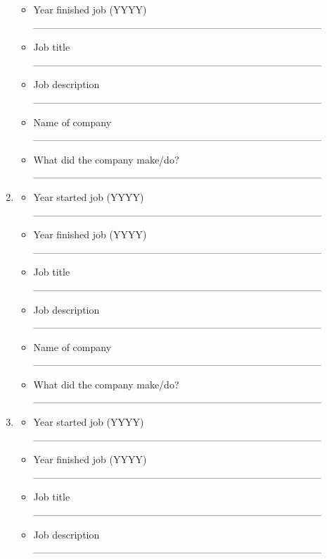 \documentclass[a4paper,10pt]{article}
\begin{document}
\begin{enumerate}
\begin{itemize}
         \item Year finished job (YYYY) \_\_\_\_\_\_\_\_\_\_\_\_\_\_\_\_\_\_\_\_\_\_\_\_\_\_\_\_\_\_\_\_\_\_\_\_\_\_\_
         \item Job title \_\_\_\_\_\_\_\_\_\_\_\_\_\_\_\_\_\_\_\_\_\_\_\_\_\_\_\_\_\_\_\_\_\_\_\_\_\_\_
         \item Job description \_\_\_\_\_\_\_\_\_\_\_\_\_\_\_\_\_\_\_\_\_\_\_\_\_\_\_\_\_\_\_\_\_\_\_\_\_\_\_
         \item Name of company \_\_\_\_\_\_\_\_\_\_\_\_\_\_\_\_\_\_\_\_\_\_\_\_\_\_\_\_\_\_\_\_\_\_\_\_\_\_\_
         \item What did the company make/do? \_\_\_\_\_\_\_\_\_\_\_\_\_\_\_\_\_\_\_\_\_\_\_\_\_\_\_\_\_\_\_\_\_\_\_\_\_\_\_
      \end{itemize}
 \item
     \begin{itemize}
         \item Year started job (YYYY) \_\_\_\_\_\_\_\_\_\_\_\_\_\_\_\_\_\_\_\_\_\_\_\_\_\_\_\_\_\_\_\_\_\_\_\_\_\_\_ 
         \item Year finished job (YYYY) \_\_\_\_\_\_\_\_\_\_\_\_\_\_\_\_\_\_\_\_\_\_\_\_\_\_\_\_\_\_\_\_\_\_\_\_\_\_\_
         \item Job title \_\_\_\_\_\_\_\_\_\_\_\_\_\_\_\_\_\_\_\_\_\_\_\_\_\_\_\_\_\_\_\_\_\_\_\_\_\_\_
         \item Job description \_\_\_\_\_\_\_\_\_\_\_\_\_\_\_\_\_\_\_\_\_\_\_\_\_\_\_\_\_\_\_\_\_\_\_\_\_\_\_
         \item Name of company \_\_\_\_\_\_\_\_\_\_\_\_\_\_\_\_\_\_\_\_\_\_\_\_\_\_\_\_\_\_\_\_\_\_\_\_\_\_\_
         \item What did the company make/do? \_\_\_\_\_\_\_\_\_\_\_\_\_\_\_\_\_\_\_\_\_\_\_\_\_\_\_\_\_\_\_\_\_\_\_\_\_\_\_
      \end{itemize}
 \item
     \begin{itemize}
         \item Year started job (YYYY) \_\_\_\_\_\_\_\_\_\_\_\_\_\_\_\_\_\_\_\_\_\_\_\_\_\_\_\_\_\_\_\_\_\_\_\_\_\_\_ 
         \item Year finished job (YYYY) \_\_\_\_\_\_\_\_\_\_\_\_\_\_\_\_\_\_\_\_\_\_\_\_\_\_\_\_\_\_\_\_\_\_\_\_\_\_\_
         \item Job title \_\_\_\_\_\_\_\_\_\_\_\_\_\_\_\_\_\_\_\_\_\_\_\_\_\_\_\_\_\_\_\_\_\_\_\_\_\_\_
         \item Job description \_\_\_\_\_\_\_\_\_\_\_\_\_\_\_\_\_\_\_\_\_\_\_\_\_\_\_\_\_\_\_\_\_\_\_\_\_\_\_

\end{itemize}
\end{enumerate}
\end{document}
